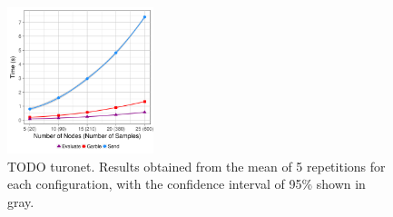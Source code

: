 % 
% 
% 
% 



\begin{figure}
  \includegraphics[width=0.38\textwidth]{plots/turonet.png}
  \caption{TODO turonet.  Results obtained from the mean of 5 repetitions for
    each configuration, with the confidence interval of 95\% shown in gray.}
  \label{turonet-times}
\end{figure}

